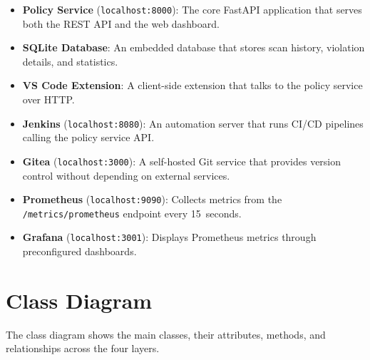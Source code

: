 \begin{itemize}[leftmargin=1.5cm]
  \item \textbf{Policy Service} (\texttt{localhost:8000}): The core FastAPI application that serves both the REST API and the web dashboard.
  \item \textbf{SQLite Database}: An embedded database that stores scan history, violation details, and statistics.
  \item \textbf{VS Code Extension}: A client-side extension that talks to the policy service over HTTP.
  \item \textbf{Jenkins} (\texttt{localhost:8080}): An automation server that runs CI/CD pipelines calling the policy service API.
  \item \textbf{Gitea} (\texttt{localhost:3000}): A self-hosted Git service that provides version control without depending on external services.
  \item \textbf{Prometheus} (\texttt{localhost:9090}): Collects metrics from the \texttt{/metrics/prometheus} endpoint every 15~seconds.
  \item \textbf{Grafana} (\texttt{localhost:3001}): Displays Prometheus metrics through preconfigured dashboards.
\end{itemize}


\section{Class Diagram}
\label{sec:classdiagram}

The class diagram shows the main classes, their attributes, methods, and relationships across the four layers.

